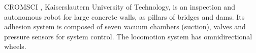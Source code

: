 
CROMSCI%
, Kaiserslautern University of Technology, is an
inspection and autonomous robot for large concrete walls, as
pillars of bridges and dams. Its adhesion system is composed of seven vacuum
chambers (suction), valves and pressure sensors for system control. The
locomotion system has omnidirectional wheels.





